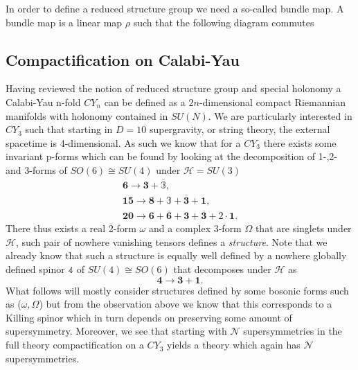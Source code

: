 In order to define a reduced structure group we need a so-called bundle map. A bundle map is a linear map $\rho$ such that the following diagram commutes
\begin{center}
\end{center}



\subsection{Compactification on Calabi-Yau}
Having reviewed the notion of reduced structure group and special holonomy a Calabi-Yau n-fold $CY_{n}$ can be defined as a $2n$-dimensional compact Riemannian manifolds with holonomy contained in $SU(N)$\cite{Blumenhagen2013}. We are particularly interested in $CY_3$ such that starting in $D=10$ supergravity, or string theory, the external spacetime is 4-dimensional. As such we know that for a $CY_3$ there exists some invariant p-forms which can be found by looking at the decomposition of 1-,2- and 3-forms of $SO(6)\cong SU(4)$ under $\mathcal{H}=SU(3)$
\begin{align*}
    \mathbf{6}\to \mathbf{3}+\mathbb{\overbar{3}},\\
    \mathbf{15}\to \mathbf{8}+\mathbb{3}+\overbar{\mathbf{3}}+\mathbf{1},\\
    \mathbf{20}\to \mathbf{6}+\overbar{\mathbf{6}}+\mathbf{3}+\overbar{\mathbf{3}}+2\cdot\mathbf{1}.
\end{align*}
There thus exists a real 2-form $\omega$ and a complex 3-form $\Omega$ that are singlets under $\mathcal{H}$, such pair of nowhere vanishing tensors defines a \emph{structure}. Note that we already know that such a structure is equally well defined by a nowhere globally defined spinor $\mathbb{4}$ of $SU(4)\cong SO(6)$ that decomposes under $\mathcal{H}$ as 
\begin{equation}
    \mathbf{4}\to \mathbf{3}+\mathbf{1}.
\end{equation}
What follows will mostly consider structures defined by some bosonic forms such as ($\omega,\Omega$) but from the observation above we know that this corresponds to a Killing spinor which in turn depends on preserving some amount of supersymmetry. Moreover, we see that starting with $\mathcal{N}$ supersymmetries in the full theory compactification on a $CY_3$ yields a theory which again has $\mathcal{N}$ supersymmetries.

